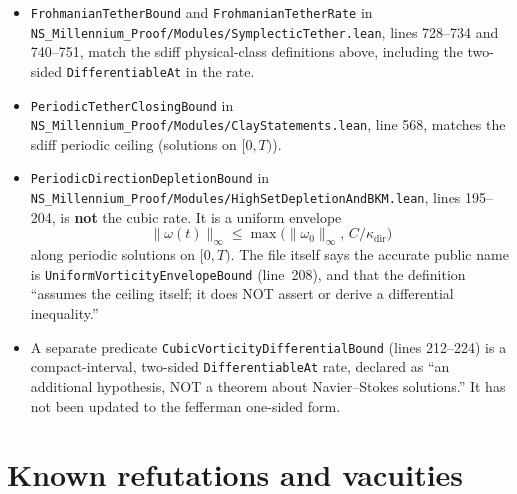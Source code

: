 \documentclass[11pt]{article}
\theoremstyle{plain}
\theoremstyle{definition}
\theoremstyle{remark}
\begin{document}
{\sloppy\begin{itemize}[leftmargin=1.4em]
\item \texttt{FrohmanianTetherBound} and \texttt{FrohmanianTetherRate} in \texttt{NS\_\hspace{0pt}Millennium\_\hspace{0pt}Proof/\hspace{0pt}Modules/\hspace{0pt}SymplecticTether.\hspace{0pt}lean}, lines 728--734 and 740--751, match the sdiff physical-class definitions above, including the two-sided \texttt{DifferentiableAt} in the rate.
\item \texttt{PeriodicTetherClosingBound} in \texttt{NS\_\hspace{0pt}Millennium\_\hspace{0pt}Proof/\hspace{0pt}Modules/\hspace{0pt}ClayStatements.\hspace{0pt}lean}, line 568, matches the sdiff periodic ceiling (solutions on \([0,T)\)).
\item \texttt{PeriodicDirectionDepletionBound} in \texttt{NS\_\hspace{0pt}Millennium\_\hspace{0pt}Proof/\hspace{0pt}Modules/\hspace{0pt}HighSetDepletionAndBKM.\hspace{0pt}lean}, lines 195--204, is \textbf{not} the cubic rate. It is a uniform envelope
\[
\|\omega(t)\|_{\infty}\le \max\bigl(\|\omega_{0}\|_{\infty},\, C/\kappa_{\mathrm{dir}}\bigr)
\]
along periodic solutions on \([0,T)\). The file itself says the accurate public name is \texttt{UniformVorticityEnvelopeBound} (line~208), and that the definition ``assumes the ceiling itself; it does NOT assert or derive a differential inequality.''
\item A separate predicate \texttt{CubicVorticityDifferentialBound} (lines 212--224) is a compact-interval, two-sided \texttt{DifferentiableAt} rate, declared as ``an additional hypothesis, NOT a theorem about Navier--Stokes solutions.'' It has not been updated to the fefferman one-sided form.
\end{itemize}}

\section{Known refutations and vacuities}
\label{sec:refutations}
\end{document}
